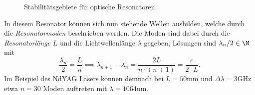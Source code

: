 \documentclass{subfiles}
\begin{document}
\begin{Antwort}
\begin{figure}[H]
            \caption{Stabilitätsgebiete für optische Resonatoren.}
            \label{fig:StabileGebiete}
        \end{figure}
        In diesem Resonator können sich nun stehende Wellen ausbilden, welche durch die \emph{Resonatormoden} beschrieben werden. Die Moden sind dabei durch die \emph{Resonatorlänge} $L$ und die Lichtwellenlänge $\lambda$ gegeben; Lösungen sind $\lambda_n/2\in\N$ mit 
        \[
            \frac{\lambda_n}{2}= \frac{L}{n}\implies \lambda_{n+1} - \lambda_n = \frac{2L}{n\cdot (n+1)} = \frac{c}{2\cdot L}.  
        \]
        Im Beispiel des NdYAG Lasers können demnach bei $L = 50\si{\mm}$ und $\Delta\lambda = 3\si{\giga\hertz}$ etwa $n = 30$ Moden auftreten mit $\lambda = 1064\si{\nano\meter}$.
    \end{Antwort}
\end{document}
